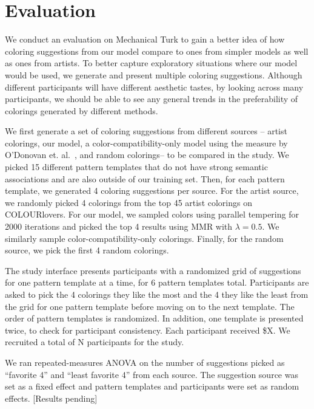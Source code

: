 \section{Evaluation}
\label{sec:evaluation}


We conduct an evaluation on Mechanical Turk to gain a better idea of how coloring suggestions from our model compare to ones from simpler models as well as ones from artists. To better capture exploratory situations where our model would be used, we generate and present multiple coloring suggestions. Although different participants will have different aesthetic tastes, by looking across many participants, we should be able to see any general trends in the preferability of colorings generated by different methods. 

We first generate a set of coloring suggestions from different sources -- artist colorings, our model, a color-compatibility-only model using the measure by O'Donovan et. al.~, and random colorings-- to be compared in the study. We picked 15 different pattern templates that do not have strong semantic associations and are also outside of our training set. Then, for each pattern template, we generated 4 coloring suggestions per source. For the artist source, we randomly picked 4 colorings from the top 45 artist colorings on COLOURlovers. For our model, we sampled colors using parallel tempering for 2000 iterations and picked the top 4 results using MMR with $\lambda = 0.5$. We similarly sample color-compatibility-only colorings. Finally, for the random source, we pick the first 4 random colorings.

The study interface presents participants with a randomized grid of suggestions for one pattern template at a time, for 6 pattern templates total. Participants are asked to pick the 4 colorings they like the most and the 4 they like the least from the grid for one pattern template before moving on to the next template. The order of pattern templates is randomized. In addition, one template is presented twice, to check for participant consistency. Each participant received \$X. We recruited a total of N participants for the study.


We ran repeated-measures ANOVA on the number of suggestions picked as ``favorite 4'' and ``least favorite 4'' from each source. The suggestion source was set as a fixed effect and pattern templates and participants were set as random effects. [Results pending]